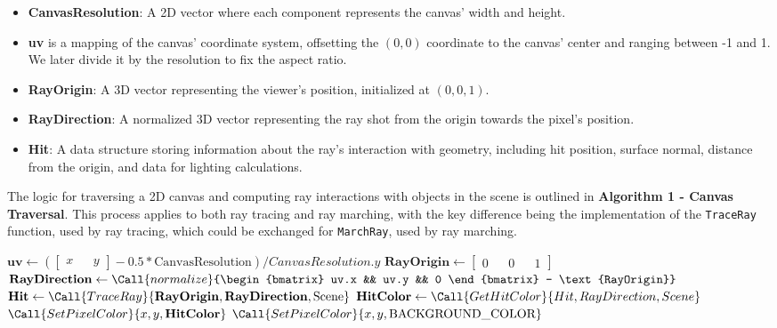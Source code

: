 \begin{itemize}
    \item \textbf{CanvasResolution}: A 2D vector where each component represents the canvas' width and height.
    \item \textbf{uv} is a mapping of the canvas' coordinate system, offsetting the $(0, 0)$ coordinate to the canvas' center and ranging between -1 and 1. We later divide it by the resolution to fix the aspect ratio.
    \item \textbf{RayOrigin}: A 3D vector representing the viewer's position, initialized at $(0, 0, 1)$.
    \item \textbf{RayDirection}: A normalized 3D vector representing the ray shot from the origin towards the pixel's position.
    \item \textbf{Hit}: A data structure storing information about the ray's interaction with geometry, including hit position, surface normal, distance from the origin, and data for lighting calculations.
\end{itemize}


The logic for traversing a 2D canvas and computing ray interactions with objects in the scene is outlined in \textbf{Algorithm 1 - Canvas Traversal}. This process applies to both ray tracing and ray marching, with the key difference being the implementation of the \texttt{TraceRay} function, used by ray tracing, which could be exchanged for \texttt{MarchRay}, used by ray marching.

\begin{algorithm}[H]
\caption{Canvas Traversal}
\label{alg:marchray}
\begin{algorithmic}[1]
            \State $\mathbf{uv} \gets \left(\begin{bmatrix} x && y \end{bmatrix} - 0.5 * \text{CanvasResolution}\right) / CanvasResolution.y$
            \State $\mathbf{RayOrigin} \gets \begin{bmatrix} 0 && 0 && 1 \end{bmatrix}$
            \State $\mathbf{RayDirection} \gets \Call{normalize}{\begin{bmatrix} uv.x && uv.y && 0 \end{bmatrix} - \text{RayOrigin}}$
            \State $\mathbf{Hit} \gets \Call{TraceRay}{\mathbf{RayOrigin}, \mathbf{RayDirection}, \text{Scene}}$
                \State $\mathbf{HitColor} \gets \Call{GetHitColor}{Hit, RayDirection, Scene}$
                \State $\Call{SetPixelColor}{x, y, \mathbf{HitColor}}$
            \Else
                \State $\Call{SetPixelColor}{x, y, \text{BACKGROUND\_COLOR}}$
            \EndIf
        \EndFor
    \EndFor
\EndProcedure
\end{algorithmic}
\end{algorithm}

